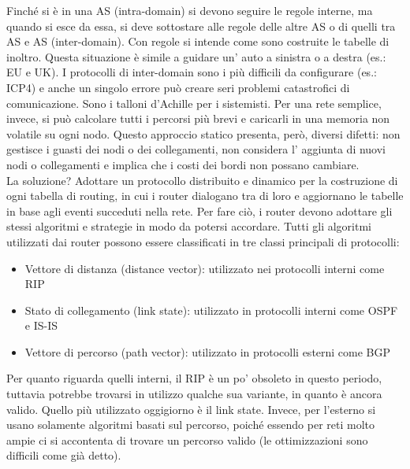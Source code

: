 Finché si è in una AS (intra-domain) si devono seguire le regole interne, ma quando si esce da essa, si deve sottostare alle regole delle altre AS o di quelli tra AS e AS (inter-domain). Con regole si intende come sono costruite le tabelle di inoltro. Questa situazione è simile a guidare un’ auto a sinistra o a destra (es.: EU e UK). I protocolli di inter-domain sono i più difficili da configurare (es.: ICP4) e anche un singolo errore può creare seri problemi catastrofici di comunicazione. Sono i talloni d’Achille per i sistemisti. Per una rete semplice, invece, si può calcolare tutti i percorsi più brevi e caricarli in una memoria non volatile su ogni nodo. Questo approccio statico presenta, però, diversi difetti: non gestisce i guasti dei nodi o dei collegamenti, non considera l’ aggiunta di nuovi nodi o collegamenti e implica che i costi dei bordi non possano cambiare. \\
La soluzione? Adottare un protocollo distribuito e dinamico per la costruzione di ogni tabella di routing, in cui i router dialogano tra di loro e aggiornano le tabelle in base agli eventi succeduti nella rete. Per fare ciò, i router devono adottare gli stessi algoritmi e strategie in modo da potersi accordare. Tutti gli algoritmi utilizzati dai router possono essere classificati in tre classi principali di protocolli:
\begin{itemize}
  \item Vettore di distanza (distance vector): utilizzato nei protocolli interni come RIP
  \item Stato di collegamento (link state): utilizzato in protocolli interni come OSPF e IS-IS
  \item Vettore di percorso (path vector): utilizzato in protocolli esterni come BGP
\end{itemize}
Per quanto riguarda quelli interni, il RIP è un po’ obsoleto in questo periodo, tuttavia potrebbe trovarsi in utilizzo qualche sua variante, in quanto è ancora valido. Quello più utilizzato oggigiorno è il link state. Invece, per l’esterno si usano solamente algoritmi basati sul percorso, poiché essendo per reti molto ampie ci si accontenta di trovare un percorso valido (le ottimizzazioni sono difficili come già detto).
